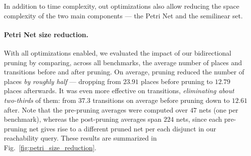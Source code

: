 In addition to time complexity, out optimizations also allow reducing the space complexity of the two main components --- the Petri Net and the semilinear set.

\paragraph{Petri Net size reduction.}

With all optimizations enabled, we evaluated the impact of our bidirectional pruning by comparing, across all benchmarks, the average number of places and transitions before and after pruning. On average, pruning reduced the number of places \textit{by roughly half} --- dropping from $23.91$ places before pruning to $12.79$ places afterwards. It was even more effective on transitions, \textit{eliminating about two-thirds} of them: from $37.3$ transitions on average before pruning down to $12.61$ after. Note that the pre-pruning averages were computed over $47$ nets (one per benchmark), whereas the post-pruning averages span $224$ nets, since each pre-pruning net gives rise to a different pruned net per each disjunct in our reachability query. These results are summarized in Fig.~\ref{fig:petri_size_reduction}.









